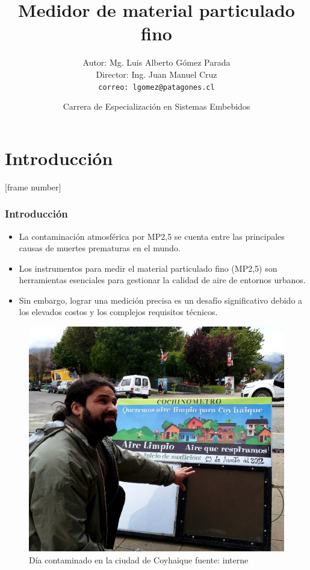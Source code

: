 \documentclass[aspectratio=169]{beamer}
\title[]{Medidor de material particulado fino }
\author{Autor: Mg. Luis Alberto Gómez Parada\\
Director:  Ing. Juan Manuel Cruz\\ \texttt{correo: lgomez@patagones.cl}} %
\date{Carrera de Especialización en Sistemas Embebidos} %
\institute{} %
\begin{document}
	
	
	
	
\begin{frame}

  \titlepage %
  
\end{frame}

\begin{frame}
\tableofcontents %
\end{frame}

\section{Introducción}
[frame number]
\begin{frame}
	\frametitle{Introducción}
	\begin{itemize}
			\item La contaminación atmosférica por MP2,5 se cuenta entre las principales causas de muertes prematuras en el mundo. 
			
		\item Los instrumentos para medir el material particulado fino (MP2,5) son herramientas esenciales para gestionar la calidad de aire de entornos urbanos. 
		\item Sin embargo, lograr una medición precisa es un desafío significativo debido a los elevados costos y los complejos requisitos técnicos.
		\end{itemize} 
	
	\begin{figure}
	\centering
	\includegraphics[width=0.5\linewidth]{images/filtro}
	\caption{Día contaminado en la ciudad de Coyhaique fuente: interne}
	\label{fig:proceso-computacion-fisica}
\end{figure}

\end{frame}
\end{document}

